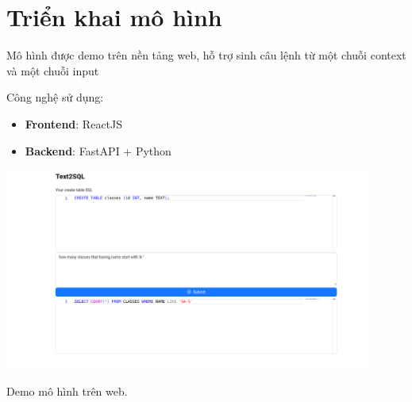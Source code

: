 \documentclass[a4paper, 10pt]{article}
\begin{document}
\section{Triển khai mô hình}
Mô hình được demo trên nền tảng web, hỗ trợ sinh câu lệnh từ một chuỗi context và một chuỗi input

Công nghệ sử dụng:
\begin{itemize}
    \item \textbf{Frontend}: ReactJS
    \item \textbf{Backend}: FastAPI + Python
\end{itemize}

\begin{minipage}{\linewidth}
    \captionsetup{type=figure}
    \centering
    \includegraphics[width=12cm]{./demo.png}
    \caption{Demo mô hình trên web.}
\end{minipage}

\newpage
\printbibliography
\end{document}

